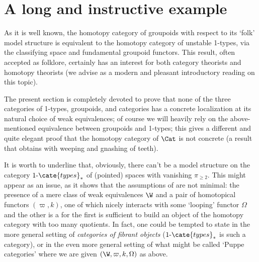 \section{A long and instructive example}
As it is well known, the homotopy category of groupoids with respect to its `folk' model structure is equivalent to the homotopy category of unstable 1-types, via the classifying space and fundamental groupoid functors. This result, often accepted as folklore, certainly has an interest for both category theorists and homotopy theorists (we advise \cite{camarena2013whirlwind} as a modern and pleasant introductory reading on this topic).

The present section is completely devoted to prove that none of the three categories of 1-types, groupoids, and categories has a concrete localization at its natural choice of weak equivalences; of course we will heavily rely on the above-mentioned equivalence between groupoids and 1-types; this gives a different and quite elegant proof that the homotopy category of $\Cat$ is not concrete (a result that \cite[§4.1]{fconc} obtains with weeping and gnashing of teeth).

It is worth to underline that, obviously, there can't be a model structure on the category $1\text{-}\cate{types}_*$ of (pointed) spaces with vanishing $\pi_{\ge 2}$. This might appear as an issue, as it shows that the assumptions of \athm{} are not minimal: the presence of a mere class of weak equivalences $\W$ and a pair of homotopical functors $(\varpi,k)$, one of which nicely interacts with some `looping' functor $\Omega$ and the other is a \wco for the first is sufficient to build an object of the homotopy category with too many quotients. In fact, one could be tempted to state \athm{} in the more general setting of \emph{categories of fibrant objects} ($1\text{-}\cate{types}_*$ is such a category), or in the even more general setting of what might be called `Puppe categories' where we are given $(\W,\varpi,k,\Omega)$ as above.

